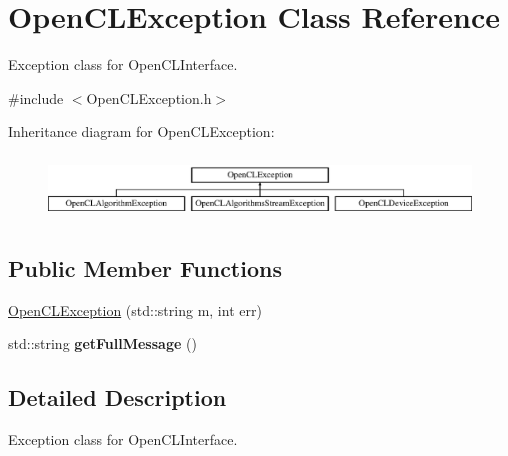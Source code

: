 \hypertarget{class_open_c_l_exception}{\section{Open\-C\-L\-Exception Class Reference}
\label{class_open_c_l_exception}
}


Exception class for Open\-C\-L\-Interface.  




{\ttfamily \#include $<$Open\-C\-L\-Exception.\-h$>$}

Inheritance diagram for Open\-C\-L\-Exception\-:\begin{figure}[H]
\begin{center}
\leavevmode
\includegraphics[height=1.696970cm]{class_open_c_l_exception}
\end{center}
\end{figure}
\subsection*{Public Member Functions}
\begin{DoxyCompactItemize}
\item 
\hyperlink{class_open_c_l_exception_aa920248683e643375a43173dd126b6a0}{Open\-C\-L\-Exception} (std\-::string m, int err)
\item 
\hypertarget{class_open_c_l_exception_aecb2085d011337562fd24d28245d15f0}{std\-::string {\bfseries get\-Full\-Message} ()}\label{class_open_c_l_exception_aecb2085d011337562fd24d28245d15f0}

\end{DoxyCompactItemize}


\subsection{Detailed Description}
Exception class for Open\-C\-L\-Interface. 

